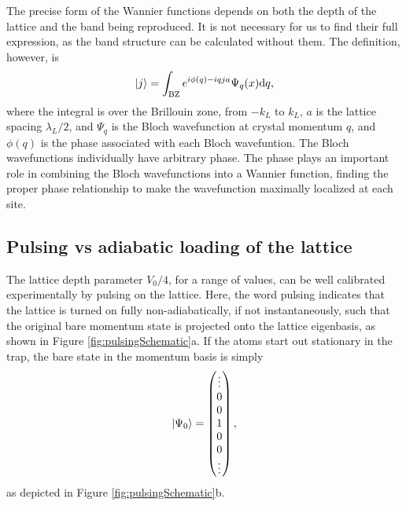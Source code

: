 The precise form of the Wannier functions depends on both the depth of the lattice and the band being reproduced. It is not necessary for us to find their full expression, as the band structure can be calculated without them. The definition, however, is
\begin{equation}
\mathinner{|{j}\rangle} = \int_{\rm BZ} e^{i \phi(q) - i q j a}\Psi_q(x) {\rm d} q,
\end{equation}
where the integral is over the Brillouin zone, from $-k_L$ to $k_L$, $a$ is the lattice spacing $\lambda_L/2$, and $\Psi_q$ is the Bloch wavefunction at crystal momentum $q$, and $\phi(q)$ is the phase associated with each Bloch wavefuntion. The Bloch wavefunctions individually have arbitrary phase. The phase plays an important role in combining the Bloch wavefunctions into a Wannier function, finding the proper phase relationship to make the wavefunction maximally localized at each site\cite{Marzari2012}. 

\subsection{Pulsing vs adiabatic loading of the lattice}

The lattice depth parameter $V_0/4$, for a range of values, can be well calibrated experimentally by pulsing on the lattice. Here, the word pulsing indicates that the lattice is turned on fully non-adiabatically, if not instantaneously, such that the original bare momentum state is projected onto the lattice eigenbasis, as shown in Figure \ref{fig:pulsingSchematic}a. If the atoms start out stationary in the trap, the bare state in the momentum basis is simply
\begin{equation}
\mathinner{|{\Psi_0}\rangle} = \begin{pmatrix} \vdots \\
0\\
0\\
1\\
0\\
0\\
\vdots
\end{pmatrix} \\,
\end{equation}
as depicted in  Figure \ref{fig:pulsingSchematic}b.

